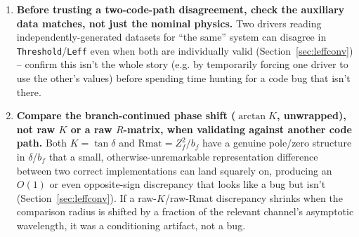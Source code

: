 \documentclass[11pt]{article}
\newcommand{\file}[1]{\texttt{#1}}
\newcommand{\sub}[1]{\texttt{#1}}
\begin{document}
\begin{enumerate}
  \emph{same} physics -- tabulate+interpolate vs. direct diagonalization
  (Section~\ref{sec:directcost}), or B-spline-box vs. SVD-box -- when no closed-form answer exists.
  Genuinely independent only if the two paths don't share the actual evaluation code (two callers
  of the same \sub{OneDimChannelsGeneric} engine, differing only in potential/grid, are
  \emph{not} independent of each other in the way ``interpolated vs. exact'' or ``\file{DeltaScat}
  vs. \file{R-matrix-prop}'s own engine'' are).
\item \textbf{Before trusting a two-code-path disagreement, check the auxiliary data matches, not
  just the nominal physics.} Two drivers reading independently-generated datasets for ``the same''
  system can disagree in \texttt{Threshold}/\texttt{Leff} even when both are individually valid
  (Section~\ref{sec:leffconv}) -- confirm this isn't the whole story (e.g. by temporarily forcing
  one driver to use the other's values) before spending time hunting for a code bug that isn't
  there.
\item \textbf{Compare the branch-continued phase shift ($\arctan K$, unwrapped), not raw $K$ or a
  raw $R$-matrix, when validating against another code path.} Both $K=\tan\delta$ and
  $\text{Rmat}=Z_f^2/b_f$ have a genuine pole/zero structure in $\delta$/$b_f$ that a small,
  otherwise-unremarkable representation difference between two correct implementations can land
  squarely on, producing an $O(1)$ or even opposite-sign discrepancy that looks like a bug but
  isn't (Section~\ref{sec:leffconv}). If a raw-$K$/raw-Rmat discrepancy shrinks when the comparison
  radius is shifted by a fraction of the relevant channel's asymptotic wavelength, it was a
  conditioning artifact, not a bug.
\end{enumerate}
\end{document}
